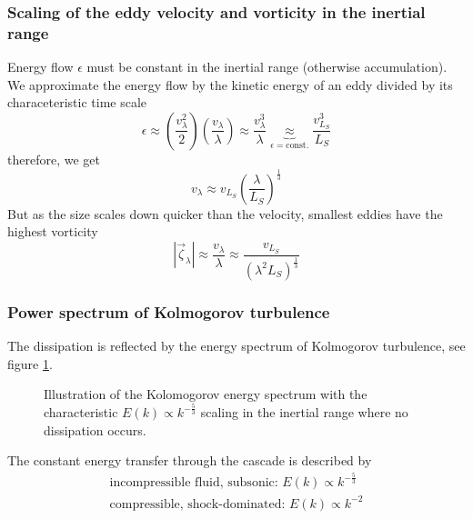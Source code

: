 \subsubsection{Scaling of the eddy velocity and vorticity in the inertial range}
Energy flow $\epsilon$ must be constant in the inertial range (otherwise accumulation).
We approximate the energy flow by the kinetic energy of an eddy divided by its characeteristic time scale
\begin{equation}
    \epsilon \approx \left( \frac{v_\lambda^2}{2} \right) \left(\frac{v_\lambda}{\lambda} \right) \approx \frac{v_\lambda^3}{\lambda} \underbrace{\approx}_{\epsilon = \text{const.}} \frac{v_{L_S}^3}{L_S}
\end{equation}
therefore, we get
\begin{equation}
    v_\lambda \approx v_{L_S} \left( \frac{\lambda}{L_S} \right)^{\frac{1}{3}}
\end{equation}
But as the size scales down quicker than the velocity, smallest eddies have the highest vorticity
\begin{equation}
    |\vec{\zeta}_\lambda| \approx \frac{v_\lambda}{\lambda} \approx \frac{v_{L_S}}{(\lambda^2 L_S)^{\frac{1}{3}}}
\end{equation}

\subsubsection{Power spectrum of Kolmogorov turbulence}
The dissipation is reflected by the energy spectrum of Kolmogorov turbulence, see figure \ref{fig:kolmogorov_spectrum}.

\begin{figure}[!htb]
    \centering
    
    \caption{Illustration of the Kolomogorov energy spectrum with the characteristic $E(k) \propto k^{-\frac{5}{3}}$ scaling in the inertial range where no dissipation occurs.}
    \label{fig:kolmogorov_spectrum}
\end{figure}

The constant energy transfer through the cascade is described by
\begin{equation}
    \begin{gathered}
        \text{incompressible fluid, subsonic: } E(k) \propto k^{-\frac{5}{3}} \\
        \text{compressible, shock-dominated: } E(k) \propto k^{-2}
    \end{gathered}
\end{equation}

